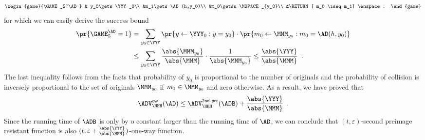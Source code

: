 \documentclass{crypto-exercise}
\newcommand{\ADVOW}[2]{\ADV^{\mathsf{ow}}_{#1}(#2)}
\newcommand{\ADVSPRE}[2]{\ADV^{\mathsf{2nd\text{-}pre}}_{#1}(#2)}
\begin{document}
\begin{solution}
\begin{align*}
\begin{game}{\GAME_5^\AD}
 & y_0\gets\YYY_0\\
 &m_1\gets \AD(h,y_0)\\
 &m_0\getsu\MSPACE_{y_0}\\
 &\RETURN [ m_0 \iseq m_1] \enspace.
\end{game}      
\end{align*}
for which we can easily derive the success bound 
\begin{align*}
\pr{\GAME_5^\AD=1}&= \sum_{y_0\in\YYY}\pr{y\gets\YYY_0:y=y_0}\cdot\pr{m_0\gets\MMM_{y_0}: m_0=\AD(h,y_0)}\\
 &\leq \sum_{y_0\in\YYY}\frac{\abs{\MMM_{y_0}}}{\abs{\MMM}}\cdot \frac{1}{\abs{\MMM_{y_0}}}\leq  \frac{\abs{\YYY}}{\abs{\MMM}}\enspace.
\end{align*}
The last inequality follows from the facts that probability of $y_0$ is proportional to the number of originals and the probability of collision is inversely proportional to the set of originals $\MMM_{y_0}$ if $m_1\in\MMM_{y_0}$ and zero otherwise. As a result, we have proved that
\begin{align*}
\ADVOW{\HHH}{\AD} \leq \ADVSPRE{\HHH}{\ADB} + \frac{\abs{\YYY}}{\abs{\MMM}}\enspace.
\end{align*}
Since the running time of $\ADB$ is only by o constant larger than the running time of $\AD$, we can conclude that $(t,\varepsilon)$-second preimage resistant function is also $(t,\varepsilon+\frac{\abs{\YYY}}{\abs{\MMM}})$-one-way function. 


\end{solution}
\end{document}
